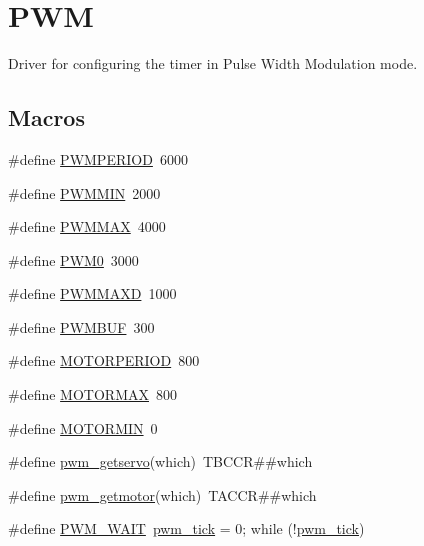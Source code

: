 \hypertarget{group___p_w_m}{}\section{P\+WM}
\label{group___p_w_m}


Driver for configuring the timer in Pulse Width Modulation mode.  


\subsection*{Macros}
\begin{DoxyCompactItemize}
\item 
\#define \hyperlink{group___p_w_m_ga96e506808fe48663a74abcafdcbfdc7e}{P\+W\+M\+P\+E\+R\+I\+OD}~6000
\item 
\#define \hyperlink{group___p_w_m_ga6f330c196a65bb05fd5b7fff59d6f62f}{P\+W\+M\+M\+IN}~2000
\item 
\#define \hyperlink{group___p_w_m_ga29eaa7ea340aed6c94c8208f548c4ac8}{P\+W\+M\+M\+AX}~4000
\item 
\#define \hyperlink{group___p_w_m_ga7a4ad06a2bcb1065209a117ea09bbfbf}{P\+W\+M0}~3000
\item 
\#define \hyperlink{group___p_w_m_ga4fda1cf5b4a72bd805a203b9665a155b}{P\+W\+M\+M\+A\+XD}~1000
\item 
\#define \hyperlink{group___p_w_m_ga314546c7b69b0cbb81eb8e251790163a}{P\+W\+M\+B\+UF}~300
\item 
\#define \hyperlink{group___p_w_m_gaeee77a1eb6566203ee0ff9f73793eef0}{M\+O\+T\+O\+R\+P\+E\+R\+I\+OD}~800
\item 
\#define \hyperlink{group___p_w_m_gae1c41fe7d060099ebab9cee16893eac0}{M\+O\+T\+O\+R\+M\+AX}~800
\item 
\#define \hyperlink{group___p_w_m_ga1f92d617a268ea424ebbd4e964ed2c7a}{M\+O\+T\+O\+R\+M\+IN}~0
\item 
\#define \hyperlink{group___p_w_m_ga4583b6e199cc79c08de94b1406783626}{pwm\+\_\+getservo}(which)~T\+B\+C\+CR\#\#which
\item 
\#define \hyperlink{group___p_w_m_ga3377aa8203e3df46d08640cc1c7fae78}{pwm\+\_\+getmotor}(which)~T\+A\+C\+CR\#\#which
\item 
\#define \hyperlink{group___p_w_m_ga0f59b97f507f6ddda8b5ba4e641fb015}{P\+W\+M\+\_\+\+W\+A\+IT}~\hyperlink{group___p_w_m_ga354856dbd0205dcf3768b19da8f692d9}{pwm\+\_\+tick} = 0; while (!\hyperlink{group___p_w_m_ga354856dbd0205dcf3768b19da8f692d9}{pwm\+\_\+tick})
\end{DoxyCompactItemize}
